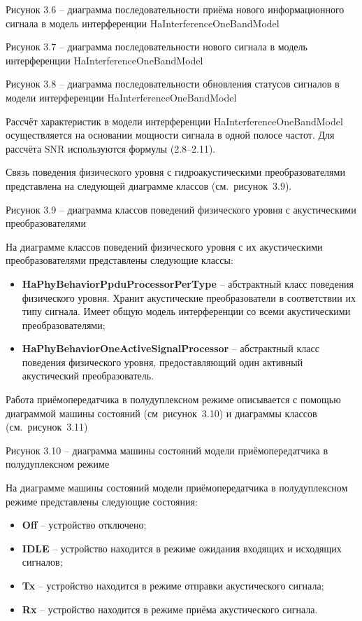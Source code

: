 Рисунок 3.6 -- диаграмма последовательности приёма нового
информационного сигнала в модель интерференции
HaInterferenceOneBandModel

Рисунок 3.7 -- диаграмма последовательности нового сигнала в модель
интерференции HaInterferenceOneBandModel

Рисунок 3.8 -- диаграмма последовательности обновления статусов сигналов
в модели интерференции HaInterferenceOneBandModel

Рассчёт характеристик в модели интерференции HaInterferenceOneBandModel
осуществляется на основании мощности сигнала в одной полосе частот. Для
рассчёта SNR используются формулы (2.8--2.11).

Связь поведения физического уровня с гидроакустическими
преобразователями представлена на следующей диаграмме классов
(см.~рисунок~3.9).

Рисунок 3.9 -- диаграмма классов поведений физического уровня с
акустическими преобразователями

На диаграмме классов поведений физического уровня с их акустическими
преобразователями представлены следующие классы:

\begin{itemize}
\item
  \textbf{HaPhyBehaviorPpduProcessorPerType} -- абстрактный класс
  поведения физического уровня. Хранит акустические преобразователи в
  соответствии их типу сигнала. Имеет общую модель интерференции со
  всеми акустическими преобразователями;
\item
  \textbf{HaPhyBehaviorOneActiveSignalProcessor} -- абстрактный класс
  поведения физического уровня, предоставляющий один активный
  акустический преобразователь.
\end{itemize}

Работа приёмопередатчика в полудуплексном режиме описывается с помощью
диаграммой машины состояний (см~рисунок~3.10) и диаграммы классов
(см.~рисунок~3.11)

Рисунок 3.10 -- диаграмма машины состояний модели приёмопередатчика в
полудуплексном режиме

На диаграмме машины состояний модели приёмопередатчика в полудуплексном
режиме представлены следующие состояния:

\begin{itemize}
\item
  \textbf{Off} -- устройство отключено;
\item
  \textbf{IDLE} -- устройство находится в режиме ожидания входящих и
  исходящих сигналов;
\item
  \textbf{Tx} -- устройство находится в режиме отправки акустического
  сигнала;
\item
  \textbf{Rx} -- устройство находится в режиме приёма акустического
  сигнала.
\end{itemize}

